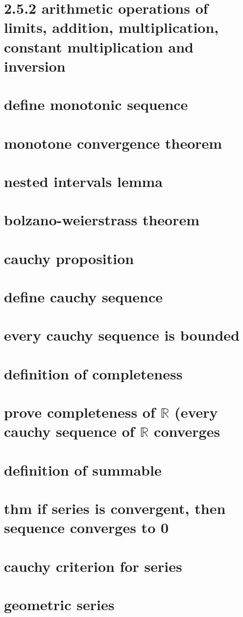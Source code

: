 \documentclass[letterpaper]{article}
\begin{document}
\section*{2.5.2 arithmetic operations of limits, addition, multiplication, constant multiplication and inversion}
\section*{define monotonic sequence}
\section*{monotone convergence theorem}
\section*{nested intervals lemma}
\section*{bolzano-weierstrass theorem}
\section*{cauchy proposition}
\section*{define cauchy sequence}
\section*{every cauchy sequence is bounded}
\section*{definition of completeness}
\section*{prove completeness of $\mathbb{R}$ (every cauchy sequence of $\mathbb{R}$ converges}
\section*{definition of summable}
\section*{thm if series is convergent, then sequence converges to 0}
\section*{cauchy criterion for series}
\section*{geometric series}
\end{document}
